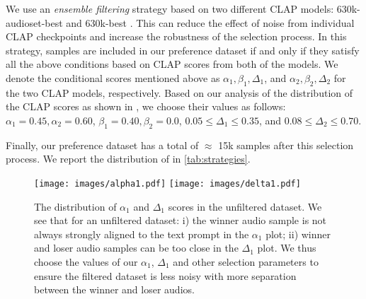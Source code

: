 We use an \emph{ensemble filtering} strategy based on two different CLAP models: \textsf{630k-audioset-best} and \textsf{630k-best} \cite{wu2023large}. This can reduce the effect of noise from individual CLAP checkpoints and increase the robustness of the selection process. In this strategy, samples are included in our preference dataset if and only if they satisfy all the above conditions based on CLAP scores from both of the models. 
We denote the conditional scores mentioned above as $\alpha_1, \beta_1, \Delta_1$, and $\alpha_2, \beta_2, \Delta_2$ for the two CLAP models, respectively. Based on our analysis of the distribution of the CLAP scores as shown in , we choose their values as follows: $\alpha_1=0.45, \alpha_2=0.60$, $\beta_1=0.40, \beta_2=0.0$, $0.05 \leq \Delta_1 \leq 0.35$, and $0.08 \leq \Delta_2 \leq 0.70$.

Finally, our preference dataset \dataset{} has a total of $\approx$ 15k samples after this selection process. We report the distribution of \dataset{} in \cref{tab:strategies}. 

\begin{figure}[b]
    \centering
    \texttt{[image: images/alpha1.pdf]}
    \texttt{[image: images/delta1.pdf]}
    \caption{\small{The distribution of $\alpha_1$ and $\Delta_1$ scores in the unfiltered dataset. We see that for an unfiltered dataset: i) the winner audio sample is not always strongly aligned to the text prompt in the $\alpha_1$ plot; ii) winner and loser audio samples can be too close in the $\Delta_1$ plot. We thus choose the values of our $\alpha_1$, $\Delta_1$ and other selection parameters to ensure the filtered dataset is less noisy with more separation between the winner and loser audios.}
    }
    \label{fig:alpha-delta}
\end{figure}

\begin{table*}[h]
\centering
\caption{Statistics of \dataset{}.}
\label{tab:strategies}
\end{table*}

